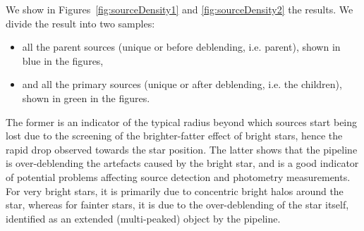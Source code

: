 \documentclass[11pt,a4paper,oneside,final]{scrartcl}
\begin{document}
We show in Figures~\ref{fig:sourceDensity1} and \ref{fig:sourceDensity2} the results. We divide the result into two samples:
\begin{itemize}
\item all the parent sources (unique or before deblending, i.e. parent), shown in blue in the figures, 
\item and all the primary sources (unique or after deblending, i.e. the children), shown in green in the figures.
\end{itemize}
%
The former is an indicator of the typical radius beyond which sources start being lost due to the screening of the brighter-fatter effect of bright stars, hence the rapid drop observed towards the star position. The latter shows that the pipeline is over-deblending the artefacts caused by the bright star, and is a good indicator of potential problems affecting source detection and photometry measurements. For very bright stars, it is primarily due to concentric bright halos around the star, whereas for fainter stars, it is due to the over-deblending of the star itself, identified as an extended (multi-peaked) object by the pipeline.
\end{document}
